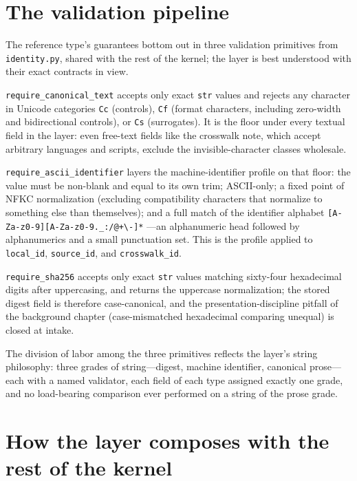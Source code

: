 \section{The validation pipeline}\label{ch03:validation}

The reference type's guarantees bottom out in three validation
primitives from \texttt{identity.py}, shared with the rest of the
kernel; the layer is best understood with their exact contracts in
view.

\texttt{require\_canonical\_text} accepts only exact \texttt{str}
values and rejects any character in Unicode categories
\texttt{Cc} (controls), \texttt{Cf} (format characters, including
zero-width and bidirectional controls), or \texttt{Cs}
(surrogates). It is the floor under every textual field in the
layer: even free-text fields like the crosswalk note, which accept
arbitrary languages and scripts, exclude the invisible-character
classes wholesale.

\texttt{require\_ascii\_identifier} layers the machine-identifier
profile on that floor: the value must be non-blank and equal to
its own trim; ASCII-only; a fixed point of NFKC normalization
(excluding compatibility characters that normalize to something
else than themselves); and a full match of the identifier
alphabet \texttt{[A-Za-z0-9][A-Za-z0-9.\_:/@+\textbackslash-]*}
---an alphanumeric head followed by alphanumerics and a small
punctuation set. This is the profile applied to
\texttt{local\_id}, \texttt{source\_id}, and
\texttt{crosswalk\_id}.

\texttt{require\_sha256} accepts only exact \texttt{str} values
matching sixty-four hexadecimal digits after uppercasing, and
returns the uppercase normalization; the stored digest field is
therefore case-canonical, and the presentation-discipline pitfall
of the background chapter (case-mismatched hexadecimal comparing
unequal) is closed at intake.

The division of labor among the three primitives reflects the
layer's string philosophy: three grades of string---digest,
machine identifier, canonical prose---each with a named validator,
each field of each type assigned exactly one grade, and no
load-bearing comparison ever performed on a string of the prose
grade.

\section{How the layer composes with the rest of the kernel}\label{ch03:composition}

